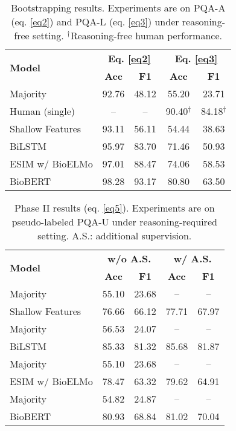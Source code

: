 \documentclass[11pt,a4paper]{article}
\begin{document}
\begin{table}
    \small
    \centering
    \begin{tabular}{lcccc}
        \toprule
        \multirow{2}{*}{\textbf{Model}} & 
        \multicolumn{2}{c}{\textbf{Eq. \ref{eq2}}} &
        \multicolumn{2}{c}{\textbf{Eq. \ref{eq3}}} \\
        \cmidrule{2-5}
        & \textbf{Acc} & \textbf{F1} & \textbf{Acc} & \textbf{F1} \\
        \midrule
        Majority & 92.76 & 48.12 & 55.20 & 23.71 \\
        Human (single) & -- & -- & 90.40$^\dagger$ & 84.18$^\dagger$ \\
        \midrule
        Shallow Features & 93.11 & 56.11 & 54.44 & 38.63 \\
        BiLSTM & 95.97 & 83.70 & 71.46 & 50.93 \\
        ESIM w/ BioELMo & 97.01 & 88.47 & 74.06 & 58.53 \\
        BioBERT & {98.28} & {93.17} & {80.80} & {63.50} \\
        \bottomrule
    \end{tabular}
    \vskip -0.15cm
    \caption{Bootstrapping results. Experiments are on PQA-A (eq. \ref{eq2}) and PQA-L (eq. \ref{eq3}) under reasoning-free setting. $^\dagger$Reasoning-free human performance.} 
    \label{tab:bootstrap}
\end{table}

\begin{table}
    \small
    \centering
    \begin{tabular}{lcccc}
        \toprule
        \multirow{2}{*}{\textbf{Model}} & 
        \multicolumn{2}{c}{\textbf{w/o A.S.}} &
        \multicolumn{2}{c}{\textbf{w/ A.S.}} \\
        \cmidrule{2-5}
        & \textbf{Acc} & \textbf{F1} & \textbf{Acc} & \textbf{F1} \\
        \midrule
        Majority & 55.10 & 23.68 & -- & -- \\
        Shallow Features & 76.66 & 66.12 & 77.71 & 67.97 \\
        \midrule
        Majority & 56.53 & 24.07 & -- & -- \\
        BiLSTM & 85.33 & 81.32 & 85.68 & 81.87 \\
        \midrule
        Majority & 55.10 & 23.68 & -- & -- \\
        ESIM w/ BioELMo & 78.47 & 63.32 & 79.62 & 64.91 \\
        \midrule
        Majority & 54.82 & 24.87 & -- & -- \\        
        BioBERT & 80.93 & 68.84 & 81.02 & 70.04 \\
        \bottomrule
    \end{tabular}
    \vskip -0.15cm
    \caption{Phase II results (eq. \ref{eq5}). Experiments are on pseudo-labeled PQA-U under reasoning-required setting. A.S.: additional supervision.
    }    
    \label{tab:phaseii}
\end{table}
\end{document}
